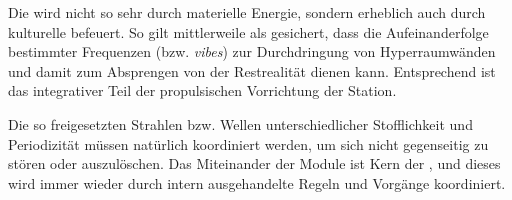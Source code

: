 \begin{newstuff}
    Die  wird nicht so sehr durch materielle Energie, sondern erheblich auch durch kulturelle befeuert. So gilt mittlerweile als gesichert, dass die Aufeinanderfolge bestimmter Frequenzen (bzw. \emph{vibes}) zur Durchdringung von Hyperraumwänden und damit zum Absprengen von der Restrealität dienen kann. Entsprechend ist das  integrativer Teil der propulsischen Vorrichtung der Station.

    Die so freigesetzten Strahlen bzw. Wellen unterschiedlicher Stofflichkeit und Periodizität müssen natürlich koordiniert werden, um sich nicht gegenseitig zu stören oder auszulöschen. Das Miteinander der Module ist Kern der , und dieses wird immer wieder durch intern ausgehandelte Regeln und Vorgänge koordiniert.
\end{newstuff}